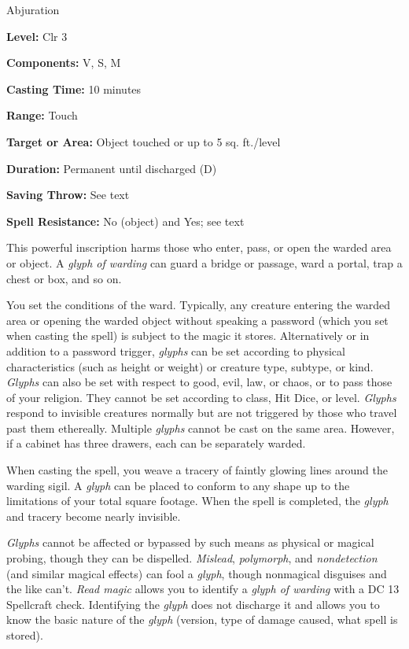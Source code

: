 
Abjuration

\textbf{Level:} Clr 3

\textbf{Components:} V, S, M

\textbf{Casting Time:} 10 minutes

\textbf{Range:} Touch

\textbf{Target or Area:} Object touched or up to 5 sq. ft./level

\textbf{Duration:} Permanent until discharged (D)

\textbf{Saving Throw:} See text

\textbf{Spell Resistance:} No (object) and Yes; see text

This powerful inscription harms those who enter, pass, or open the warded area 
or object. A \textit{glyph of warding} can guard a bridge or passage, ward a portal, 
trap a chest or box, and so on.

You set the conditions of the ward. Typically, any creature entering the warded 
area or opening the warded object without speaking a password (which you set when 
casting the spell) is subject to the magic it stores. Alternatively or in addition 
to a password trigger, \textit{glyphs} can be set according to physical characteristics 
(such as height or weight) or creature type, subtype, or kind. \textit{Glyphs} can 
also be set with respect to good, evil, law, or chaos, or to pass those of your 
religion. They cannot be set according to class, Hit Dice, or level. \textit{Glyphs 
}respond to invisible creatures normally but are not triggered by those who travel 
past them ethereally. Multiple \textit{glyphs} cannot be cast on the same area. 
However, if a cabinet has three drawers, each can be separately warded.

When casting the spell, you weave a tracery of faintly glowing lines around the 
warding sigil. A \textit{glyph} can be placed to conform to any shape up to the 
limitations of your total square footage. When the spell is completed, the \textit{glyph 
}and tracery become nearly invisible.

\textit{Glyphs} cannot be affected or bypassed by such means as physical or magical 
probing, though they can be dispelled. \textit{Mislead}, \textit{polymorph}, and 
\textit{nondetection} (and similar magical effects) can fool a \textit{glyph}, 
though nonmagical disguises and the like can't. \textit{Read magic} allows you 
to identify a \textit{glyph of warding} with a DC 13 Spellcraft check. Identifying 
the \textit{glyph} does not discharge it and allows you to know the basic nature 
of the \textit{glyph} (version, type of damage caused, what spell is stored).

